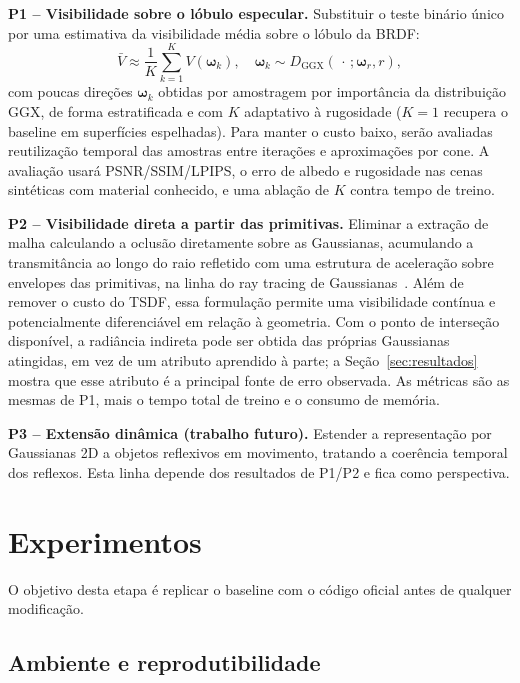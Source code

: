 \documentclass[conference]{IEEEtran}
\begin{document}
\textbf{P1 -- Visibilidade sobre o lóbulo especular.} Substituir o teste binário único por uma estimativa da visibilidade média sobre o lóbulo da BRDF:
\begin{equation}
\bar{V} \approx \frac{1}{K}\sum_{k=1}^{K} V(\boldsymbol{\omega}_k), \quad \boldsymbol{\omega}_k \sim D_{\text{GGX}}(\,\cdot\,;\boldsymbol{\omega}_r, r),
\end{equation}
com poucas direções $\boldsymbol{\omega}_k$ obtidas por amostragem por importância da distribuição GGX, de forma estratificada e com $K$ adaptativo à rugosidade ($K=1$ recupera o baseline em superfícies espelhadas). Para manter o custo baixo, serão avaliadas reutilização temporal das amostras entre iterações e aproximações por cone. A avaliação usará PSNR/SSIM/LPIPS, o erro de albedo e rugosidade nas cenas sintéticas com material conhecido, e uma ablação de $K$ contra tempo de treino.

\textbf{P2 -- Visibilidade direta a partir das primitivas.} Eliminar a extração de malha calculando a oclusão diretamente sobre as Gaussianas, acumulando a transmitância ao longo do raio refletido com uma estrutura de aceleração sobre envelopes das primitivas, na linha do ray tracing de Gaussianas~\cite{moenne2024_3dgrt}. Além de remover o custo do TSDF, essa formulação permite uma visibilidade contínua e potencialmente diferenciável em relação à geometria. Com o ponto de interseção disponível, a radiância indireta pode ser obtida das próprias Gaussianas atingidas, em vez de um atributo aprendido à parte; a Seção~\ref{sec:resultados} mostra que esse atributo é a principal fonte de erro observada. As métricas são as mesmas de P1, mais o tempo total de treino e o consumo de memória.

\textbf{P3 -- Extensão dinâmica (trabalho futuro).} Estender a representação por Gaussianas 2D a objetos reflexivos em movimento, tratando a coerência temporal dos reflexos. Esta linha depende dos resultados de P1/P2 e fica como perspectiva.

\section{Experimentos}\label{sec:exp}

O objetivo desta etapa é replicar o baseline com o código oficial antes de qualquer modificação.

\subsection{Ambiente e reprodutibilidade}
\end{document}
